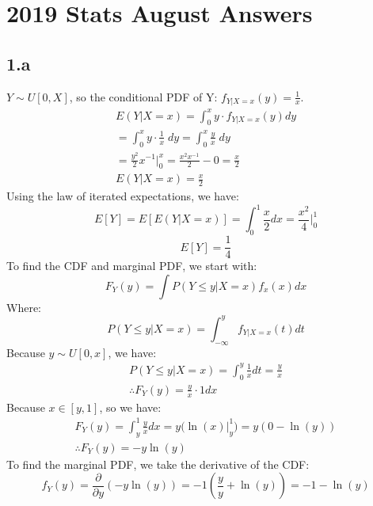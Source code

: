 \section{2019 Stats August Answers}
\subsection{1.a}
\(Y \sim U[0,X]\), so the conditional PDF of Y: \(f_{Y|X=x}(y)=\frac{1}{x}\).
\begin{align*}
    E(Y|X=x) = \int_0^x y \cdot f_{Y|X=x}(y) dy \\
    =\int_0^x y \cdot \frac{1}{x} \;dy = \int_0^x \frac{y}{x}\; dy \\
    = \frac{y^2}{2} x^{-1} \bigg\rvert_0^x  = \frac{x^2 x^{-1}}{2} - 0 = \frac{x}{2} \\
     \boxed{E(Y|X=x) = \frac{x}{2}}
\end{align*}
Using the law of iterated expectations, we have:
\[
E[Y] = E[E(Y|X=x)] = \int_0^1 \frac{x}{2} dx = \frac{x^2}{4} \bigg\rvert_0^1
\]
\[
\boxed{E[Y] = \frac{1}{4}}
\]
To find the CDF and marginal PDF, we start with:
\[
    F_Y(y) = \int P(Y\leq y|X=x) f_x(x) dx
\] Where:
\[
P(Y\leq y|X=x) = \int_{-\infty}^yf_{Y|X=x}(t)dt
\]
Because \(y\sim U[0,x]\), we have:
\begin{gather*}
P(Y\leq y|X=x) = \int_0^y \frac{1}{x} dt = \frac{y}{x} \\
\therefore F_Y(y) = \frac{y}{x} \cdot 1 dx
\end{gather*}
Because \(x \in [y,1]\), so we have:
\begin{align*}
    F_Y(y) = \int_y^1 \frac{y}{x} dx = y \bigg ( \ln(x) \bigg\rvert_y^1 \bigg ) = y(0-\ln(y)) \\
    \therefore \boxed{F_Y(y) = -y\ln(y)}
\end{align*}
To find the marginal PDF, we take the derivative of the CDF:
\[
f_Y(y) = \frac{\partial}{\partial y}(-y\ln(y)) = -1 \left ( \frac{y}{y} + \ln(y) \right ) = \boxed{-1-\ln(y)}
\]
